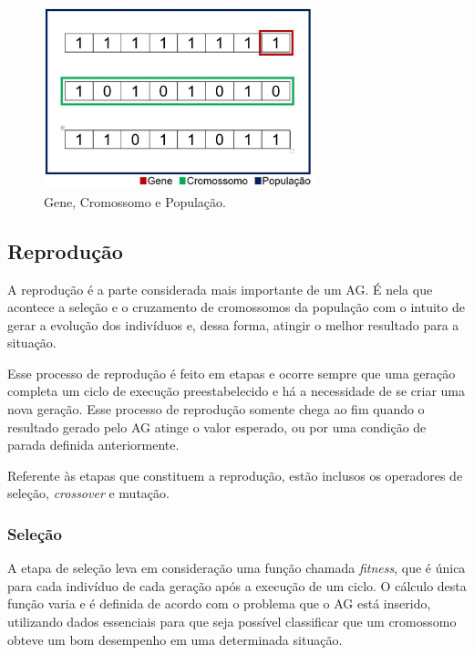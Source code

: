 \begin{figure}[htb]
        \centering
        \caption{\label{fig_gene}Gene, Cromossomo e População.}
        \includegraphics[width=0.7\textwidth]{images/gene.jpg}
\end{figure}

\subsection{Reprodu{\c c}{\~a}o}

A reprodução é a parte considerada mais importante de um AG. É
nela que acontece a seleção e o cruzamento de cromossomos da
população com o intuito de gerar a evolução dos indivíduos e,
dessa forma, atingir o melhor resultado para a situação. 

Esse processo de reprodução é feito em etapas e ocorre sempre
que uma geração completa um ciclo de execução preestabelecido
e há a necessidade de se criar uma nova geração. Esse processo
de reprodução somente chega ao fim quando o resultado gerado
pelo AG atinge o valor esperado, ou por uma condição de parada
definida anteriormente. 

Referente às etapas que constituem a reprodução, estão
inclusos os operadores de seleção, \textit{crossover} e
mutação.

\subsubsection{Sele{\c c}{\~a}o}

A etapa de seleção leva em consideração uma função chamada
\textit{fitness}, que é única para cada indivíduo de cada
geração após a execução de um ciclo. O cálculo desta função
varia e é definida de acordo com o problema que o AG está
inserido, utilizando dados essenciais para que seja possível
classificar que um cromossomo obteve um bom desempenho em uma
determinada situação. 


